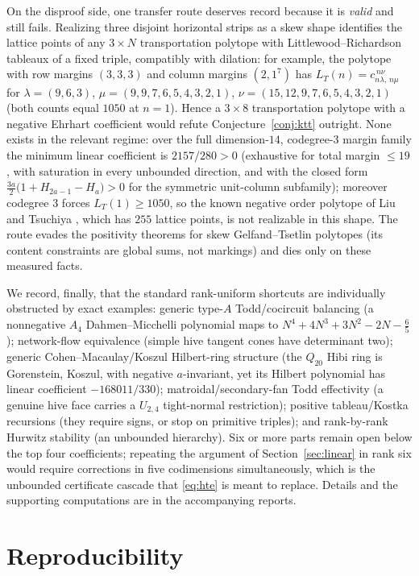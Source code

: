 \documentclass[11pt]{amsart}
\theoremstyle{definition}
\newcommand{\lam}{\lambda}
\begin{document}
On the disproof side, one transfer route deserves record because it is
\emph{valid} and still fails. Realizing three disjoint horizontal strips as a
skew shape identifies the lattice points of any $3\times N$ transportation
polytope with Littlewood--Richardson tableaux of a fixed triple, compatibly
with dilation: for example, the polytope with row margins $(3,3,3)$ and column
margins $(2,1^{7})$ has $L_T(n)=c^{\,n\nu}_{n\lam,\,n\mu}$ for
$\lam=(9,6,3)$, $\mu=(9,9,7,6,5,4,3,2,1)$, $\nu=(15,12,9,7,6,5,4,3,2,1)$
(both counts equal $1050$ at $n=1$). Hence a $3\times 8$ transportation
polytope with a negative Ehrhart coefficient would refute
Conjecture~\ref{conj:ktt} outright. None exists in the relevant regime: over
the full dimension-$14$, codegree-$3$ margin family the minimum linear
coefficient is $2157/280>0$ (exhaustive for total margin $\le 19$, with
saturation in every unbounded direction, and with the closed form
$\tfrac{3a}{2}\bigl(1+H_{2a-1}-H_a\bigr)>0$ for the symmetric unit-column
subfamily); moreover codegree $3$ forces $L_T(1)\ge 1050$, so the known
negative order polytope of Liu and Tsuchiya \cite{LiuTsuchiya}, which has
$255$ lattice points, is not realizable in this shape. The route evades the
positivity theorems for skew Gelfand--Tsetlin polytopes (its content
constraints are global sums, not markings) and dies only on these measured
facts.

We record, finally, that the standard rank-uniform shortcuts are individually
obstructed by exact examples: generic type-$A$ Todd/cocircuit balancing (a
nonnegative $A_4$ Dahmen--Micchelli polynomial maps to
$N^4+4N^3+3N^2-2N-\tfrac65$); network-flow equivalence (simple hive tangent cones
have determinant two); generic Cohen--Macaulay/Koszul Hilbert-ring structure (the
$Q_{20}$ Hibi ring is Gorenstein, Koszul, with negative $a$-invariant, yet its
Hilbert polynomial has linear coefficient $-168011/330$); matroidal/secondary-fan
Todd effectivity (a genuine hive face carries a $U_{2,4}$ tight-normal
restriction); positive tableau/Kostka recursions (they require signs, or stop on
primitive triples); and rank-by-rank Hurwitz stability (an unbounded hierarchy).
Six or more parts remain open below the top four coefficients; repeating the
argument of Section~\ref{sec:linear} in rank six would require corrections in
five codimensions simultaneously, which is the unbounded certificate cascade
that \eqref{eq:hte} is meant to replace. Details and the supporting computations
are in the accompanying reports.

\section{Reproducibility}\label{sec:repro}
\end{document}
